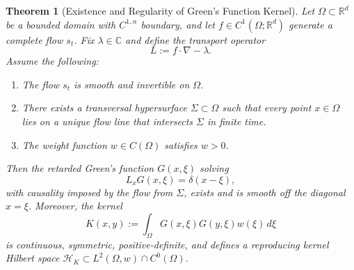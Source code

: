 \documentclass[11pt]{article}
\theoremstyle{plain}
\newtheorem{theorem}{Theorem}[section]
\def\[{\begin{equation}}
\def\]{\end{equation}}
\begin{document}
\begin{theorem}[Existence and Regularity of Green’s Function Kernel]
Let $\Omega \subset \mathbb{R}^d$ be a bounded domain with $C^{1,\alpha}$ boundary, and let $f \in C^1(\Omega; \mathbb{R}^d)$ generate a complete flow $s_t$. Fix $\lambda \in \mathbb{C}$ and define the transport operator
\[
L := f \cdot \nabla - \lambda.
\]
Assume the following:
\begin{enumerate}
    \item The flow $s_t$ is smooth and invertible on $\Omega$.
    \item There exists a transversal hypersurface $\Sigma \subset \Omega$ such that every point $x \in \Omega$ lies on a unique flow line that intersects $\Sigma$ in finite time.
    \item The weight function $w \in C(\Omega)$ satisfies $w > 0$.
\end{enumerate}
Then the retarded Green’s function $G(x, \xi)$ solving
\[
L_x G(x, \xi) = \delta(x - \xi),
\]
with causality imposed by the flow from $\Sigma$, exists and is smooth off the diagonal $x = \xi$. Moreover, the kernel
\[
K(x, y) := \int_\Omega G(x, \xi) G(y, \xi) w(\xi) \, d\xi
\]
is continuous, symmetric, positive-definite, and defines a reproducing kernel Hilbert space $\mathcal{H}_K \subset L^2(\Omega, w) \cap C^0(\Omega)$.
\end{theorem}
\end{document}
